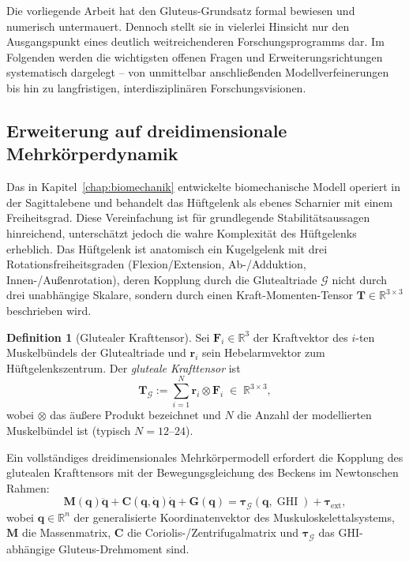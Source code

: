﻿\documentclass[12pt,a4paper]{report}
\theoremstyle{plain}
\theoremstyle{definition}
\newtheorem{definition}[theorem]{Definition}
\theoremstyle{remark}
\DeclareMathOperator{\GHI}{GHI}
\begin{document}
	Die vorliegende Arbeit hat den Gluteus-Grundsatz formal bewiesen und numerisch
	untermauert. Dennoch stellt sie in vielerlei Hinsicht nur den Ausgangspunkt
	eines deutlich weitreichenderen Forschungsprogramms dar. Im Folgenden werden
	die wichtigsten offenen Fragen und Erweiterungsrichtungen systematisch
	dargelegt -- von unmittelbar anschließenden Modellverfeinerungen bis hin
	zu langfristigen, interdisziplinären Forschungsvisionen.
	
	\subsection{Erweiterung auf dreidimensionale Mehrkörperdynamik}
	\label{subsec:3d}
	
	Das in Kapitel~\ref{chap:biomechanik} entwickelte biomechanische Modell
	operiert in der Sagittalebene und behandelt das Hüftgelenk als ebenes
	Scharnier mit einem Freiheitsgrad. Diese Vereinfachung ist für grundlegende
	Stabilitätsaussagen hinreichend, unterschätzt jedoch die wahre Komplexität
	des Hüftgelenks erheblich. Das Hüftgelenk ist anatomisch ein
	Kugelgelenk mit drei Rotationsfreiheitsgraden (Flexion/Extension,
	Ab-/Adduktion, Innen-/Außenrotation), deren Kopplung durch die Glutealtriade
	$\mathcal{G}$ nicht durch drei unabhängige Skalare, sondern durch einen
	Kraft-Momenten-Tensor $\mathbf{T} \in \mathbb{R}^{3\times 3}$ beschrieben wird.
	
	\begin{definition}[Glutealer Krafttensor]
		\label{def:tensor}
		Sei $\mathbf{F}_i \in \mathbb{R}^3$ der Kraftvektor des $i$-ten Muskelbündels
		der Glutealtriade und $\mathbf{r}_i$ sein Hebelarmvektor zum Hüftgelenkszentrum.
		Der \emph{gluteale Krafttensor} ist
		\[
		\mathbf{T}_\mathcal{G} := \sum_{i=1}^{N} \mathbf{r}_i \otimes \mathbf{F}_i
		\;\in\; \mathbb{R}^{3\times 3},
		\]
		wobei $\otimes$ das äußere Produkt bezeichnet und $N$ die Anzahl der
		modellierten Muskelbündel ist (typisch $N = 12$--$24$).
	\end{definition}
	
	Ein vollständiges dreidimensionales Mehrkörpermodell erfordert die Kopplung
	des glutealen Krafttensors mit der Bewegungsgleichung des Beckens
	im Newtonschen Rahmen:
	\[
	\mathbf{M}(\mathbf{q})\ddot{\mathbf{q}} + \mathbf{C}(\mathbf{q},\dot{\mathbf{q}})\dot{\mathbf{q}}
	+ \mathbf{G}(\mathbf{q}) = \boldsymbol{\tau}_\mathcal{G}(\mathbf{q}, \GHI) + \boldsymbol{\tau}_{\mathrm{ext}},
	\]
	wobei $\mathbf{q} \in \mathbb{R}^n$ der generalisierte Koordinatenvektor des
	Muskuloskelettalsystems, $\mathbf{M}$ die Massenmatrix,
	$\mathbf{C}$ die Coriolis-/Zentrifugalmatrix und
	$\boldsymbol{\tau}_\mathcal{G}$ das GHI-abhängige Gluteus-Drehmoment sind.
	
\end{document}
